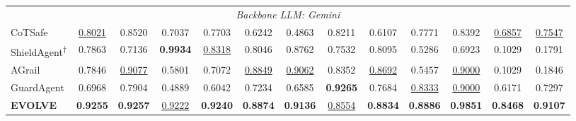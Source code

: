 \begin{table}[ht]
{\begin{tabular}{lcccccccccccc}
\midrule

\multicolumn{13}{c}{\textit{Backbone LLM: Gemini}} \\[2pt]
CoTSafe
  & \underline{0.8021} & 0.8520 & 0.7037 & 0.7703
  & 0.6242 & 0.4863 & 0.8211 & 0.6107
  & 0.7771 & 0.8392 & \underline{0.6857} & \underline{0.7547} \\
ShieldAgent\textsuperscript{$\dagger$}
  & 0.7863 & 0.7136 & \textbf{0.9934} & \underline{0.8318}
  & 0.8046 & 0.8762 & 0.7532 & 0.8095
  & 0.5286 & 0.6923 & 0.1029 & 0.1791 \\
AGrail
  & 0.7846 & \underline{0.9077} & 0.5801 & 0.7072
  & \underline{0.8849} & \underline{0.9062} & 0.8352 & \underline{0.8692}
  & 0.5457 & \underline{0.9000} & 0.1029 & 0.1846 \\
GuardAgent
  & 0.6968 & 0.7904 & 0.4889 & 0.6042
  & 0.7234 & 0.6585 & \textbf{0.9265} & 0.7684
  & \underline{0.8333} & \underline{0.9000} & 0.6171 & 0.7297 \\
\textbf{EVOLVE}
  & \textbf{0.9255} & \textbf{0.9257} & \underline{0.9222} & \textbf{0.9240}
  & \textbf{0.8874} & \textbf{0.9136} & \underline{0.8554} & \textbf{0.8834}
  & \textbf{0.8886} & \textbf{0.9851} & \textbf{0.8468} & \textbf{0.9107} \\

\bottomrule
\end{tabular}%
}
\end{table}